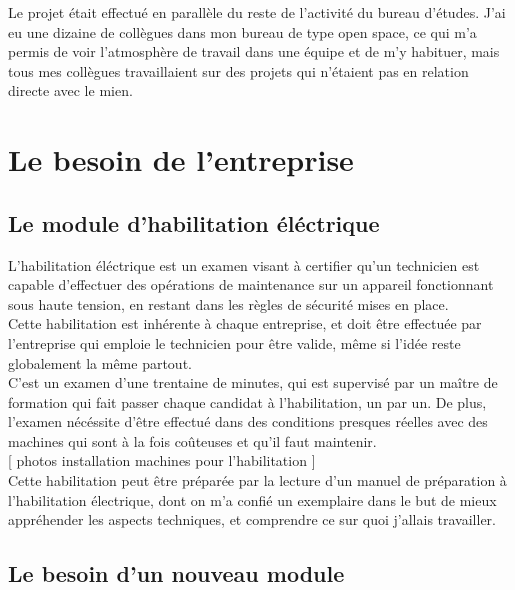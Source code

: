 \documentclass[a4paper]{article}
\begin{document}
    Le projet était effectué en parallèle du reste de l'activité du bureau d'études. J'ai eu une dizaine de collègues dans mon bureau de type open space, ce qui m'a permis de voir l'atmosphère de travail dans une équipe et de m'y habituer, mais tous mes collègues travaillaient sur des projets qui n'étaient pas en relation directe avec le mien. \\
    
    \section{Le besoin de l'entreprise}
    \subsection{Le module d'habilitation éléctrique}

        L'habilitation éléctrique est un examen visant à certifier qu'un technicien est capable d'effectuer des opérations de maintenance sur un appareil fonctionnant sous haute tension, en restant dans les règles de sécurité mises en place. \\

        Cette habilitation est inhérente à chaque entreprise, et doit être effectuée par l'entreprise qui emploie le technicien pour être valide, même si l'idée reste globalement la même partout. \\

        C'est un examen d'une trentaine de minutes, qui est supervisé par un maître de formation qui fait passer chaque candidat à l'habilitation, un par un. De plus, l'examen nécéssite d'être effectué dans des conditions presques réelles avec des machines qui sont à la fois coûteuses et qu'il faut maintenir. \\

        [ photos installation machines pour l'habilitation ] \\

        Cette habilitation peut être préparée par la lecture d'un manuel de préparation à l'habilitation électrique, dont on m'a confié un exemplaire dans le but de mieux appréhender les aspects techniques, et comprendre ce sur quoi j'allais travailler.

    \subsection{Le besoin d'un nouveau module}
\end{document}

